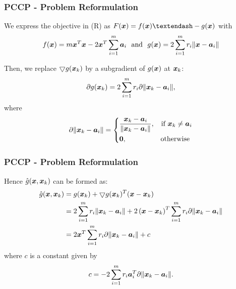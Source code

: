
\begin{frame} 
\frametitle{PCCP - Problem Reformulation}
We express the objective in (R) as $F(\Bx) = f(\Bx) –- g(\Bx)$ with 
 \begin{equation}  \nonumber 
f(\Bx) =  
m \Bx^T\Bx - 2 \Bx^T\sum^m_{i=1} \Ba_i \ \ \mbox{and } \ g(\Bx) = 2 \sum^m_{i = 1} r_i \|\Bx - \Ba_i\| 
\end{equation}
  
Then, we replace $\bigtriangledown g(\Bx_k)$ by a subgradient of $g(\Bx)$ at $\Bx_k$:
\begin{equation} 
\nonumber
\partial g{(\Bx_k)}  = 2 \sum^m_{i = 1} r_i \partial \|\Bx_k - \Ba_i\|, 
\end{equation}
where 
\begin{equation}
\nonumber
\partial \|\Bx_k - \Ba_i\|  = \left\{
	\begin{aligned}
	& \frac{\Bx_k - \Ba_i}{\|\Bx_k - \Ba_i\|}, &\mbox{if } \Bx_k \neq \Ba_i \\
	& \BO, &\mbox{otherwise }
	\end{aligned}
\right.
\end{equation}
\end{frame}

\begin{frame} 
\frametitle{PCCP - Problem Reformulation}
\phantom{m}
Hence  $ \hat{g}(\Bx,\Bx_k) $ can be formed as: 
\begin{equation} 
\nonumber
\begin{aligned}
  \hat{g}(\Bx,\Bx_k)   & =   g(\Bx_k) +  \bigtriangledown g(\Bx_k)^T(\Bx - \Bx_k) \\
  & =   2 \sum^m_{i=1} r_i \|\Bx_k - \Ba_i\|   +  2 \left( \Bx - \Bx_k \right)^{T} \sum^m_{i=1} r_i \partial \|\Bx_k - \Ba_i\| \\
& = 2\Bx^T \sum^m_{i=1} r_i \partial \|\Bx_k - \Ba_i \| + c
\end{aligned}
\end{equation} 
where $c$ is a constant given  by
\begin{equation} 
\nonumber
 c = - 2 \sum_{i = 1}^m r_i \Ba_i^T \partial \|\Bx_k - \Ba_i\|.
\end{equation} 
\end{frame}

